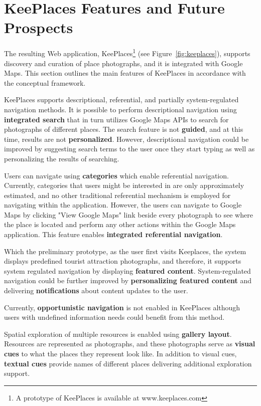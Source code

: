 {\section{KeePlaces Features and Future Prospects}
The resulting Web application, KeePlaces\footnote[1]{A prototype of KeePlaces is available at www.keeplaces.com} (see Figure~\ref{fig:keeplaces}), supports discovery and curation of place photographs, and it is integrated with Google Maps. This section outlines the main features of KeePlaces in accordance with the conceptual framework. 

KeePlaces supports descriptional, referential, and partially system-regulated navigation methods. It is possible to perform descriptional navigation using \textbf{integrated search} that in turn utilizes Google Maps APIs to search for photographs of different places. The search feature is not \textbf{guided}, and at this time, results are not \textbf{personalized}. However, descriptional navigation could be improved by suggesting search terms to the user once they start typing as well as personalizing the results of searching. 

Users can navigate using \textbf{categories} which enable referential navigation. Currently, categories that users might be interested in are only approximately estimated, and no other traditional referential mechanism is employed for navigating within the application. However, the users can navigate to Google Maps by clicking "View Google Maps" link beside every photograph to see where the place is located and perform any other actions within the Google Maps application. This feature enables \textbf{integrated referential navigation}. 

Which the preliminary prototype, as the user first visits Keeplaces, the system displays predefined tourist attraction photographs, and therefore, it supports system regulated navigation by displaying \textbf{featured content}. System-regulated navigation could be further improved by \textbf{personalizing featured content} and delivering \textbf{notifications} about content updates to the user. 

Currently, \textbf{opportunistic navigation} is not enabled in KeePlaces although users with undefined information needs could benefit from this method.

Spatial exploration of multiple resources is enabled using \textbf{gallery layout}. 
Resources are represented as photographs, and these photographs serve as \textbf{visual cues} to what the places they represent look like. In addition to visual cues, \textbf{textual cues} provide names of different places delivering additional exploration support.

}
